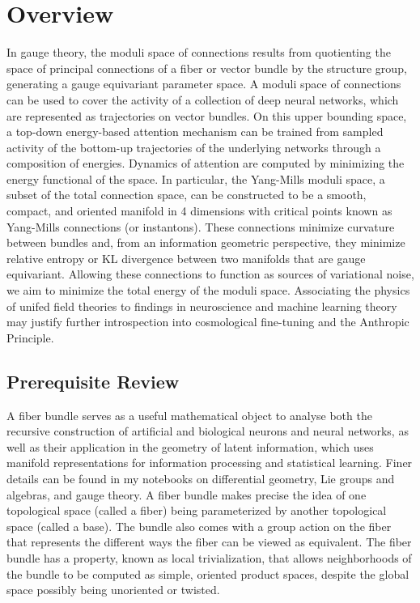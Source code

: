 \documentclass{article}
\begin{document}
\section{Overview}
In gauge theory, the moduli space of connections results from quotienting the space of principal connections of a fiber or vector bundle by the structure group, generating a gauge equivariant parameter space. A moduli space of connections can be used to cover the activity of a collection of deep neural networks, which are represented as trajectories on vector bundles. On this upper bounding space, a top-down energy-based attention mechanism can be trained from sampled activity of the bottom-up trajectories of the underlying networks through a composition of energies. Dynamics of attention are computed by minimizing the energy functional of the space. In particular, the Yang-Mills moduli space, a subset of the total connection space, can be constructed to be a smooth, compact, and oriented manifold in 4 dimensions with critical points known as Yang-Mills connections (or instantons). These connections minimize curvature between bundles and, from an information geometric perspective, they minimize relative entropy or KL divergence between two manifolds that are gauge equivariant. Allowing these connections to function as sources of variational noise, we aim to minimize the total energy of the moduli space. Associating the physics of unifed field theories to findings in neuroscience and machine learning theory may justify further introspection into cosmological fine-tuning and the Anthropic Principle.



\subsection{Prerequisite Review}
    A fiber bundle serves as a useful mathematical object to analyse both the recursive construction of artificial and biological neurons and neural networks, as well as their application in the geometry of latent information, which uses manifold representations for information processing and statistical learning.
    Finer details can be found in my notebooks on differential geometry, Lie groups and algebras, and gauge theory. A fiber bundle makes precise the idea of one topological space (called a fiber) being parameterized by another topological space (called a base). The bundle also comes with a group action on the fiber that represents the different ways the fiber can be viewed as equivalent. The fiber bundle has a property, known as local trivialization, that allows neighborhoods of the bundle to be computed as simple, oriented product spaces, despite the global space possibly being unoriented or twisted.
    
\end{document}

